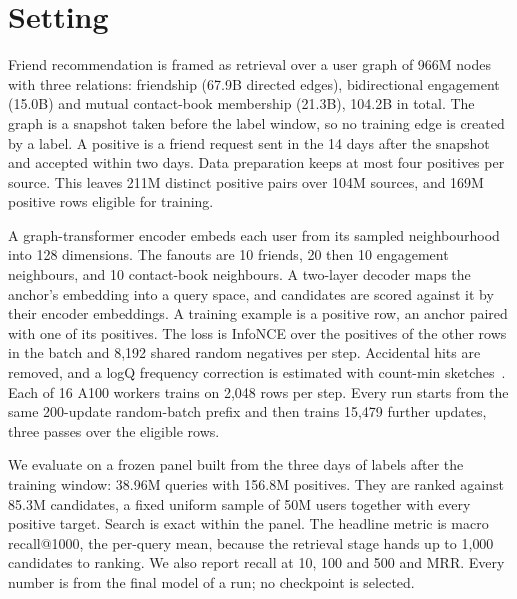 \section{Setting}
\label{sec:setting}

 Friend recommendation is framed as retrieval over a user graph of 966M nodes with three
relations: friendship (67.9B directed edges), bidirectional engagement (15.0B) and mutual contact-book membership
(21.3B), 104.2B in total. The graph is a snapshot taken before the label window, so no training edge is created by a
label. A positive is a friend request sent in the 14 days after the snapshot and accepted within two days. Data
preparation keeps at most four positives per source. This leaves 211M distinct positive pairs over 104M sources, and
169M positive rows eligible for training.

 A graph-transformer encoder embeds each user from its sampled neighbourhood into 128
dimensions. The fanouts are 10 friends, 20 then 10 engagement neighbours, and 10 contact-book neighbours. A two-layer
decoder maps the anchor's embedding into a query space, and candidates are scored against it by their encoder
embeddings. A training example is a positive row, an anchor paired with one of its positives. The loss is InfoNCE over
the positives of the other rows in the batch and 8{,}192 shared random negatives per step. Accidental hits are removed,
and a logQ frequency correction is estimated with count-min sketches~\cite{yi2019sampling}. Each of 16 A100 workers
trains on 2{,}048 rows per step. Every run starts from the same 200-update random-batch prefix and then trains
15{,}479 further updates, three passes over the eligible rows.

 We evaluate on a frozen panel built from the three days of labels after the training window: 38.96M
queries with 156.8M positives. They are ranked against 85.3M candidates, a fixed uniform sample of 50M users together
with every positive target. Search is exact within the panel. The headline metric is macro recall@1000, the per-query
mean, because the retrieval stage hands up to 1{,}000 candidates to ranking. We also report recall at 10, 100 and 500 and
MRR. Every number is from the final model of a run; no checkpoint is selected.
